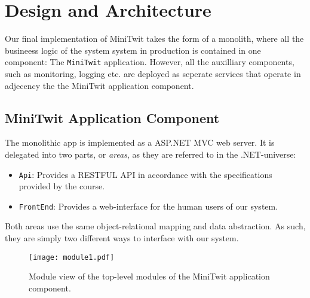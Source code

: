 \section{Design and Architecture}\label{sec:design-arch}

Our final implementation of MiniTwit takes the form of a monolith, where all the busineess logic of the system system in production is contained in one component: The \texttt{MiniTwit} application.
However, all the auxilliary components, such as monitoring, logging etc. are deployed as seperate services that operate in adjecency the the MiniTwit application component.


\subsection{MiniTwit Application Component}

The monolithic app is implemented as a ASP.NET MVC web server. It is delegated into two parts, or \textit{areas}, as they are referred to in the .NET-universe:

\begin{itemize}
	\item \texttt{Api}: Provides a RESTFUL API in accordance with the specifications provided by the course. %
	\item \texttt{FrontEnd}: Provides a web-interface for the human users of our system. %
\end{itemize}

Both areas use the same object-relational mapping and data abstraction. As such, they are simply two different ways to interface with our system.

\begin{figure}
	\begin{center}
		\texttt{[image: module1.pdf]}
	\end{center}
	\caption{Module view of the top-level modules of the MiniTwit application component.}\label{fig:module1}
\end{figure}



